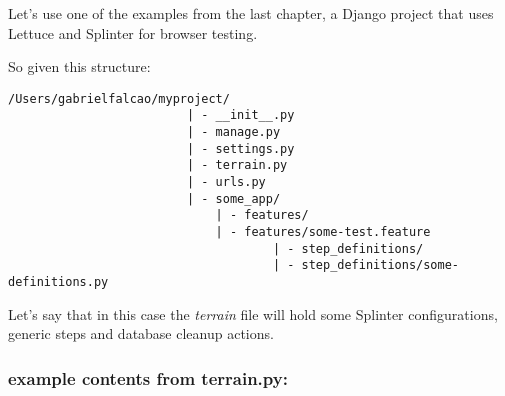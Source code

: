 \documentclass[letterpaper]{article}
\begin{document}
Let's use one of the examples from the last chapter, a Django project
that uses Lettuce and Splinter for browser testing.

\noindent
So given this structure:

\footnotesize
\begin{verbatim}
/Users/gabrielfalcao/myproject/
                         | - __init__.py
                         | - manage.py
                         | - settings.py
                         | - terrain.py
                         | - urls.py
                         | - some_app/
                             | - features/
                             | - features/some-test.feature
                                     | - step_definitions/
                                     | - step_definitions/some-definitions.py
\end{verbatim}
\normalsize

\noindent
Let's say that in this case the \textit{terrain} file will hold some
Splinter configurations, generic steps and database cleanup actions.

\subsubsection*{example contents from terrain.py:}
\end{document}
